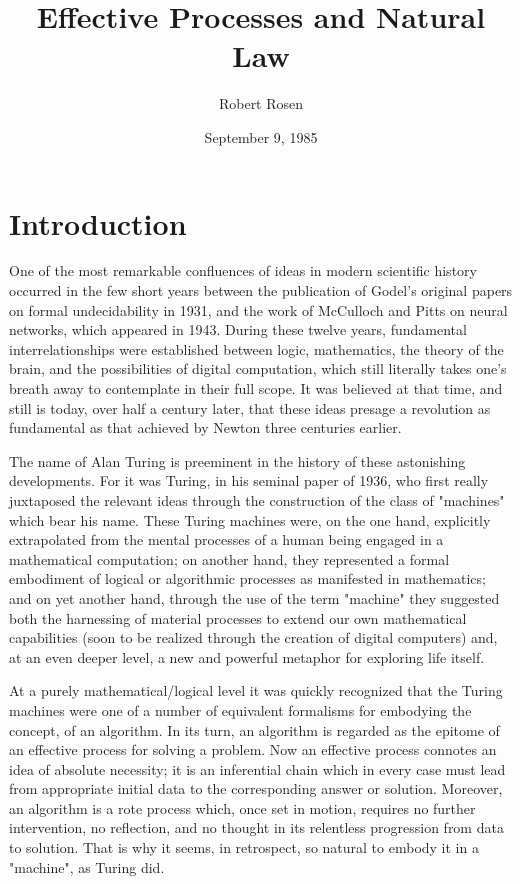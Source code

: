 \documentclass[a4paper,12pt]{article}
\title{Effective Processes and Natural Law}
\date{September 9, 1985}	%
\author{Robert Rosen}
\begin{document}
\maketitle

\setcounter{tocdepth}{2}
\tableofcontents

\section{Introduction}

One of the most remarkable confluences of ideas in modern scientific history occurred in the few short years between the publication of Godel's
original papers on formal undecidability in 1931, and the work of McCulloch and Pitts on neural networks, which appeared in 1943.
During these twelve years, fundamental interrelationships were established between logic, mathematics, the theory of the brain,
and the possibilities of digital computation, which still literally takes one's breath away to contemplate in their full scope.
It was believed at that time, and still is today, over half a century later, that these ideas presage a revolution as fundamental
as that achieved by Newton three centuries earlier.

The name of Alan Turing is preeminent in the history of these astonishing developments. For it was Turing, in his seminal paper of 1936,
who first really juxtaposed the relevant ideas through the construction of the class of "machines" which bear his name.
These Turing machines were, on the one hand, explicitly extrapolated from the mental processes of a human being engaged in a mathematical computation;
on another hand, they represented a formal embodiment of logical or algorithmic processes as manifested in mathematics;
and on yet another hand, through the use of the term "machine" they suggested both the harnessing of material processes to extend
our own mathematical capabilities (soon to be realized through the creation of digital computers) and, at an even deeper level, a new and powerful
metaphor for exploring life itself.

At a purely mathematical/logical level it was quickly recognized that the Turing machines were one of a number of equivalent formalisms for
embodying the concept, of an algorithm. In its turn, an algorithm is regarded as the epitome of an effective process for solving a problem.
Now an effective process connotes an idea of absolute necessity; it is an inferential chain which in every case must lead from appropriate initial data to the
corresponding answer or solution. Moreover, an algorithm is a rote process which, once set in motion, requires no further intervention, no reflection,
and no thought in its relentless progression from data to solution. That is why it seems, in retrospect, so natural to embody it in a "machine", as Turing did.
\end{document}
